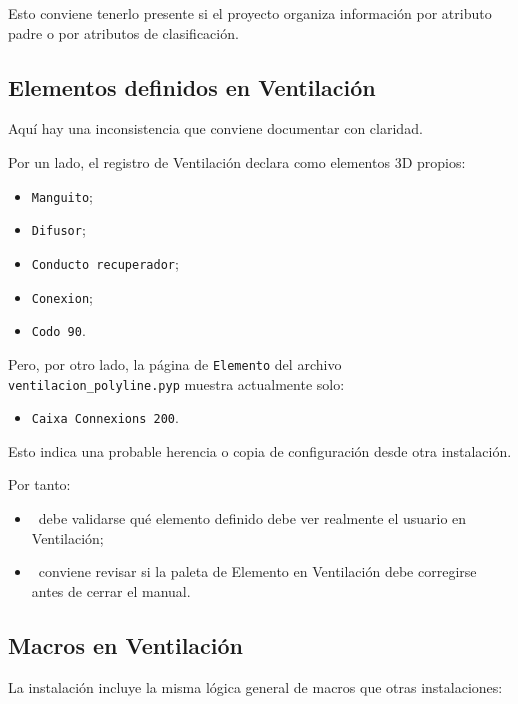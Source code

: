 Esto conviene tenerlo presente si el proyecto organiza información por atributo padre o por atributos de clasificación.

\subsection{Elementos definidos en Ventilación}

Aquí hay una inconsistencia que conviene documentar con claridad.

Por un lado, el registro de Ventilación declara como elementos 3D propios:

\begin{itemize}
\item \texttt{Manguito};
\item \texttt{Difusor};
\item \texttt{Conducto recuperador};
\item \texttt{Conexion};
\item \texttt{Codo 90}.
\end{itemize}

Pero, por otro lado, la página de \texttt{Elemento} del archivo \texttt{ventilacion\_polyline.pyp} muestra actualmente solo:

\begin{itemize}
\item \texttt{Caixa Connexions 200}.
\end{itemize}

Esto indica una probable herencia o copia de configuración desde otra instalación.

Por tanto:

\begin{itemize}
\item \pendingtag\ debe validarse qué elemento definido debe ver realmente el usuario en Ventilación;
\item \pendingtag\ conviene revisar si la paleta de Elemento en Ventilación debe corregirse antes de cerrar el manual.
\end{itemize}


\subsection{Macros en Ventilación}

La instalación incluye la misma lógica general de macros que otras instalaciones:

